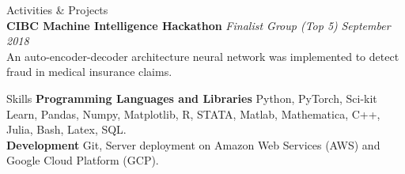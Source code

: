 \documentclass{resume} %
\begin{document}
\begin{rSection}{Activities \& Projects}
\\{\bf CIBC Machine Intelligence Hackathon} \emph{Finalist Group (Top 5)} \hfill \emph{September 2018}
\\
An auto-encoder-decoder architecture neural network was implemented to detect fraud in medical insurance claims.
\\

\end{rSection}

\begin{rSection}{Skills}
\textbf{Programming Languages and Libraries} Python, PyTorch, Sci-kit Learn, Pandas, Numpy, Matplotlib, R, STATA, Matlab, Mathematica, C++, Julia, Bash, Latex, SQL.
\\\textbf{Development} Git, Server deployment on Amazon Web Services (AWS) and Google Cloud Platform (GCP).
\end{rSection}


\end{document}
